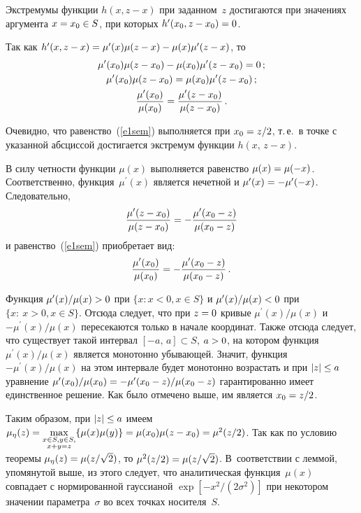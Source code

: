 \begin{multicols}{2}
  Экстремумы функции $h(x,z-x)$ при заданном~$z$ достигаются при 
значениях аргумента $x\hm=x_0\in S$, при которых $h^\prime (x_0,z-
x_0)\hm=0$.
  
  Так как $h^\prime(x,z-x)\hm=\mu^\prime(x)\mu(z-x)\hm - \mu(x) 
\mu^{\prime}(z-x)$, то
\begin{gather}
  \mu^\prime(x_0) \mu(z-x_0) -\mu(x_0)\mu^\prime(z-x_0)=0\,;\notag\\
  \mu^\prime(x_0)\mu(z-x_0)=\mu(x_0)\mu^\prime (z-x_0)\,;\notag\\
  \displaystyle\frac{\displaystyle \mu^\prime(x_0)\mathstrut}{\displaystyle \mu(x_0)\mathstrut}=\displaystyle\frac{\displaystyle \mu^\prime(z-x_0)\mathstrut}{\displaystyle \mu(z-x_0)\mathstrut}\,.
  \label{e1sem}
  \end{gather}
  
  Очевидно, что равенство~(\ref{e1sem}) выполняется при $x_0\hm=z/2$, т.\,е.\ в точке с 
указанной абсциссой достигается экстремум функции $h(x,\,z-x)$.
  
  В силу четности функции $\mu(x)$ выполняется равенство $\mu(x)\hm=\mu(-
x)$. Соответственно, функция~$\mu^\prime(x)$ является нечетной и 
$\mu^\prime(x)\hm=-\mu^\prime(-x)$. Следовательно, 
$$
\displaystyle\frac{\displaystyle \mu^\prime(z-x_0)\mathstrut}{\displaystyle \mu(z-x_0)\mathstrut}= -\displaystyle\frac{\displaystyle \mu^\prime(x_0-z)\mathstrut}{\displaystyle \mu(x_0-z)\mathstrut}
$$ 
и  равенство~(\ref{e1sem}) приобретает вид:
  $$
  \displaystyle\frac{\displaystyle \mu^\prime(x_0)\mathstrut}{\displaystyle \mu(x_0)\mathstrut}= -\displaystyle\frac{\displaystyle \mu^\prime(x_0-z)\mathstrut}{\displaystyle \mu(x_0-z)\mathstrut}\,.
  $$
  
  Функция $\mu^\prime(x)/\mu(x)\hm>0$ при $\{x: x<0, x\in S\}$ и 
$\mu^\prime(x)/\mu(x)\hm<0$ при $\{x:\ x>0, x\in S\}$. Отсюда следует, что при 
$z\hm=0$ кривые $\mu^\prime(x)/\mu(x)$ и $-\mu^\prime(x)/\mu(x)$ 
пересекаются только в начале координат. Также отсюда следует, что 
существует такой интервал $[-a,\,a]\subset S$, $a\hm>0$, на котором функция 
$\mu^\prime(x)/\mu(x)$ является монотонно убывающей. Значит, функция 
$-\mu^\prime(x)/\mu(x)$ на этом интервале будет монотонно возрастать и при 
$\vert z \vert \hm\leq a$ уравнение ${\mu^\prime(x_0)}/{\mu(x_0)}\hm= -
{\mu^\prime(x_0-z)}/{\mu(x_0-z)}$ гарантированно имеет единственное 
решение. Как было отмечено выше, им является $x_0\hm=z/2$.
     
     Таким образом, при $\vert z\vert \hm\leq a$ имеем $\mu_\eta(z)\hm= 
\max\limits_{\substack{{x\in S, y\in S,}\\{x+y=z}}}\{ \mu(x)\mu(y)\}\hm= 
\mu(x_0)\mu(z-x_0)\hm= \mu^2(z/2)$. Так как по условию теоремы 
$\mu_\eta(z)\hm= \mu(z/\sqrt{2})$, то $\mu^2(z/2)\hm=\mu(z/\sqrt{2})$. 
В~соответствии с леммой, упомянутой выше, из этого следует, что 
аналитическая функция~$\mu(x)$ совпадает с нормированной гауссианой 
$\exp\left[ -x^2/(2\sigma^2)\right]$ при некотором значении параметра~$\sigma$ 
во всех точках носителя~$S$.
     

\end{multicols}

